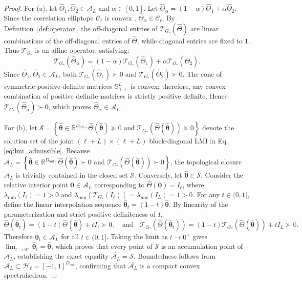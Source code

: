 \documentclass[default,sn-mathphys,Numbered]{sn-jnl}
\theoremstyle{thmstyleone}
\theoremstyle{thmstylethree}
\theoremstyle{thmstyletwo}
\newcommand{\outp}{\text{out}}
\newcommand{\eqnref}[1]{\eqref{#1}}
\begin{document}
\begin{proof}
For (a), let $\hat{\Theta}_1, \hat{\Theta}_2 \in \mathcal{A}_L$ and $\alpha \in [0, 1]$. Let $\hat{\Theta}_\alpha = (1-\alpha)\hat{\Theta}_1 + \alpha \hat{\Theta}_2$. Since the correlation elliptope $\mathcal{C}_\ell$ is convex \citep{Pelamatti}, $\hat{\Theta}_\alpha \in \mathcal{C}_\ell$. By Definition~\ref{def:operator}, the off-diagonal entries of $\mathcal{T}_{G_*}(\hat{\Theta})$ are linear combinations of the off-diagonal entries of $\hat{\Theta}$, while diagonal entries are fixed to $1$. Thus $\mathcal{T}_{G_*}$ is an affine operator, satisfying:
\begin{equation}
\mathcal{T}_{G_*}(\hat{\Theta}_\alpha) = (1 - \alpha) \mathcal{T}_{G_*}(\hat{\Theta}_1) + \alpha \mathcal{T}_{G_*}(\hat{\Theta}_2).
\end{equation}
Since $\hat{\Theta}_1, \hat{\Theta}_2 \in \mathcal{A}_L$, both $\mathcal{T}_{G_*}(\hat{\Theta}_1) \succ 0$ and $\mathcal{T}_{G_*}(\hat{\Theta}_2) \succ 0$. The cone of symmetric positive definite matrices $\mathbb{S}_{++}^L$ is convex; therefore, any convex combination of positive definite matrices is strictly positive definite. Hence $\mathcal{T}_{G_*}(\hat{\Theta}_\alpha) \succ 0$, which proves $\hat{\Theta}_\alpha \in \mathcal{A}_L$.

For (b), let $\mathcal{S} = \left\{ \hat{\bm{\theta}} \in \mathbb{R}^{D_{\outp}} : \hat{\Theta}(\hat{\bm{\theta}}) \succeq 0 \text{ and } \mathcal{T}_{G_*}(\hat{\Theta}(\hat{\bm{\theta}})) \succeq 0 \right\}$ denote the solution set of the joint $(\ell + L) \times (\ell + L)$ block-diagonal LMI in Eq.\eqnref{eq:lmi_admissible}. Because $\mathcal{A}_L = \left\{ \hat{\bm{\theta}} \in \mathbb{R}^{D_{\outp}} : \hat{\Theta}(\hat{\bm{\theta}}) \succ 0 \text{ and } \mathcal{T}_{G_*}(\hat{\Theta}(\hat{\bm{\theta}})) \succ 0 \right\}$, the topological closure $\overline{\mathcal{A}_L}$ is trivially contained in the closed set $\mathcal{S}$. Conversely, let $\hat{\bm{\theta}} \in \mathcal{S}$. Consider the relative interior point $\bm{0} \in \mathcal{A}_L$ corresponding to $\hat{\Theta}(\bm{0}) = I_\ell$, where $\lambda_{\min}(I_\ell) = 1 > 0$ and $\lambda_{\min}(\mathcal{T}_{G_*}(I_\ell)) = \lambda_{\min}(I_L) = 1 > 0$. For any $t \in (0, 1]$, define the linear interpolation sequence $\hat{\bm{\theta}}_t = (1-t)\hat{\bm{\theta}}$. By linearity of the parameterization and strict positive definiteness of $I$,
\begin{equation}
\hat{\Theta}(\hat{\bm{\theta}}_t) = (1-t)\hat{\Theta}(\hat{\bm{\theta}}) + t I_\ell \succ 0, \quad \text{and} \quad \mathcal{T}_{G_*}(\hat{\Theta}(\hat{\bm{\theta}}_t)) = (1-t)\mathcal{T}_{G_*}(\hat{\Theta}(\hat{\bm{\theta}})) + t I_L \succ 0.
\end{equation}
Therefore $\hat{\bm{\theta}}_t \in \mathcal{A}_L$ for all $t \in (0, 1]$. Taking the limit as $t \to 0^+$ gives $\lim_{t \to 0^+} \hat{\bm{\theta}}_t = \hat{\bm{\theta}}$, which proves that every point of $\mathcal{S}$ is an accumulation point of $\mathcal{A}_L$, establishing the exact equality $\overline{\mathcal{A}_L} = \mathcal{S}$. Boundedness follows from $\overline{\mathcal{A}_L} \subset \mathcal{H}_\ell = [-1, 1]^{D_{\outp}}$, confirming that $\overline{\mathcal{A}_L}$ is a compact convex spectrahedron.


\end{proof}
\end{document}
